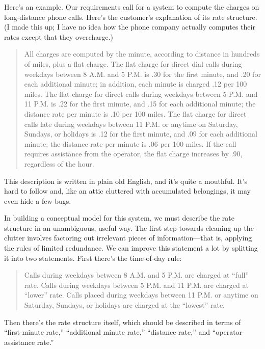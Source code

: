 Here's an example. Our requirements call for a system to compute
the charges on long-distance phone calls. Here's the customer's
explanation of its rate structure. (I made this up; I have no idea how the phone
company actually computes their rates except that they overcharge.)

\begin{quotation}
\noindent All charges are computed by the minute, according to distance in hundreds
of miles, plus a flat charge. The flat charge for direct dial calls during
weekdays between 8 A.M. and 5 P.M. is .30 for the first minute, and .20 for
each additional minute; in addition, each minute is charged .12 per 100
miles. The flat charge for direct calls during weekdays between 5 P.M. and
11 P.M. is .22 for the first minute, and .15 for each additional minute; the
distance rate per minute is .10 per 100 miles. The flat charge for direct calls
late during weekdays between 11 P.M. or anytime on Saturday, Sundays, or
holidays is .12 for the first minute, and .09 for each additional minute; the
distance rate per minute is .06 per 100 miles. If the call requires assistance
from the operator, the flat charge increases by .90, regardless of the hour.
\end{quotation}

\noindent This description is written in plain old English, and it's quite a mouthful.
It's hard to follow and, like an attic cluttered with accumulated
belongings, it may even hide a few bugs.


In building a conceptual model for this system, we must describe
the rate structure in an unambiguous, useful way. The first step towards
cleaning up the clutter involves factoring out irrelevant pieces of
information---that is, applying the rules of limited redundance. We can
improve this statement a lot by splitting it into two statements. First
there's the time-of-day rule:

\begin{quotation}
\noindent Calls during weekdays between 8 A.M. and 5 P.M. are charged at ``full'' rate.
Calls during weekdays between 5 P.M. and 11 P.M. are charged at ``lower''
rate. Calls placed during weekdays between 11 P.M. or anytime on Saturday,
Sundays, or holidays are charged at the ``lowest'' rate.
\end{quotation}

\noindent Then there's the rate structure itself, which should be described in terms
of ``first-minute rate,'' ``additional minute rate,'' ``distance rate,'' and
``operator-assistance rate.''

